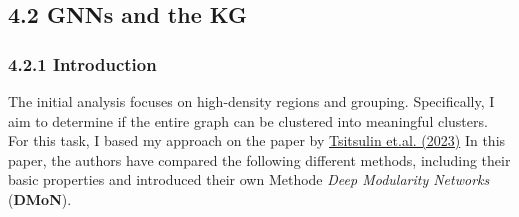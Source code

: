 \documentclass[
]{article}
\begin{document}
\subsection{4.2 GNNs and the KG}\label{gnns-and-the-kg}

\subsubsection{4.2.1 Introduction}\label{introduction-2}

The initial analysis focuses on high-density regions and grouping.
Specifically, I aim to determine if the entire graph can be clustered
into meaningful clusters. For this task, I based my approach on the
paper by
\href{https://www.jmlr.org/papers/volume24/20-998/20-998.pdf}{Tsitsulin
et.al. (2023)} In this paper, the authors have compared the following
different methods, including their basic properties and introduced their
own Methode \emph{Deep Modularity Networks} (\textbf{DMoN}).
\end{document}
